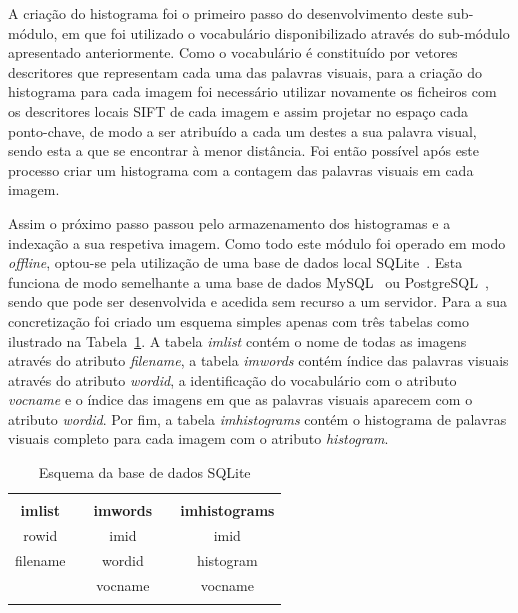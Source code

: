 A criação do histograma foi o primeiro passo do desenvolvimento deste sub-módulo, em que foi utilizado o vocabulário disponibilizado através do sub-módulo apresentado anteriormente. Como o vocabulário é constituído por vetores descritores que representam cada uma das palavras visuais, para a criação do histograma para cada imagem foi necessário utilizar novamente os ficheiros com os descritores locais SIFT de cada imagem e assim projetar no espaço cada ponto-chave, de modo a ser atribuído a cada um destes a sua palavra visual, sendo esta a que se encontrar à menor distância. Foi então possível após este processo criar um histograma com a contagem das palavras visuais em cada imagem.

Assim o próximo passo passou pelo armazenamento dos histogramas e a indexação a sua respetiva imagem. Como todo este módulo foi operado em modo \textit{offline}, optou-se pela utilização de uma base de dados local SQLite~\cite{sqlite}. Esta funciona de modo semelhante a uma base de dados MySQL~\cite{mysql} ou PostgreSQL~\cite{postgresql}, sendo que pode ser desenvolvida e acedida sem recurso a um servidor. Para a sua concretização foi criado um esquema simples apenas com três tabelas como ilustrado na Tabela~\ref{tab:schemadb}. A tabela \textit{imlist} contém o nome de todas as imagens através do atributo \textit{filename}, a tabela \textit{imwords} contém índice das palavras visuais através do atributo \textit{wordid}, a identificação do vocabulário com o atributo \textit{vocname} e o índice das imagens em que as palavras visuais aparecem com o atributo \textit{wordid}. Por fim, a tabela \textit{imhistograms} contém o histograma de palavras visuais completo para cada imagem com o atributo \textit{histogram}.

\begin{table}[h]
\centering
\begin{tabular}{lcccc}
\multicolumn{5}{l}{} \\ \cline{1-1} \cline{3-3} \cline{5-5} 
\multicolumn{1}{|c|}{\cellcolor[HTML]{C0C0C0}\textbf{imlist}} & \multicolumn{1}{c|}{} & \multicolumn{1}{c|}{\cellcolor[HTML]{C0C0C0}\textbf{imwords}} & \multicolumn{1}{c|}{} & \multicolumn{1}{c|}{\cellcolor[HTML]{C0C0C0}\textbf{imhistograms}} \\ \cline{1-1} \cline{3-3} \cline{5-5} 
\multicolumn{1}{|c|}{rowid} & \multicolumn{1}{c|}{} & \multicolumn{1}{c|}{imid} & \multicolumn{1}{c|}{} & \multicolumn{1}{c|}{imid} \\ \cline{1-1} \cline{3-3} \cline{5-5} 
\multicolumn{1}{|c|}{filename} & \multicolumn{1}{c|}{\multirow{-3}{*}{}} & \multicolumn{1}{c|}{wordid} & \multicolumn{1}{c|}{} & \multicolumn{1}{c|}{histogram} \\ \cline{1-1} \cline{3-3} \cline{5-5} 
 & \multicolumn{1}{l|}{} & \multicolumn{1}{c|}{vocname} & \multicolumn{1}{c|}{\multirow{-4}{*}{}} & \multicolumn{1}{c|}{vocname} \\ \cline{3-3} \cline{5-5} 
\multicolumn{5}{l}{}
\end{tabular}
\caption{Esquema da base de dados SQLite}
\label{tab:schemadb}
\end{table}

